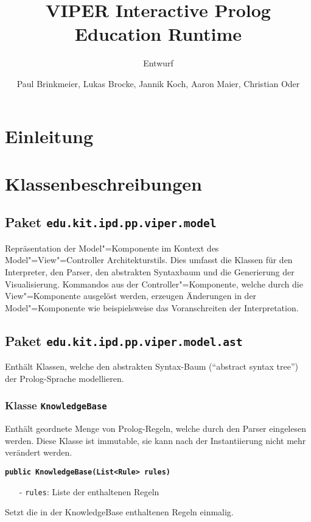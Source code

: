 \documentclass[parskip=full,11pt,twoside]{scrartcl}
\title{VIPER Interactive Prolog Education Runtime}
\subtitle{Entwurf}
\author{Paul Brinkmeier, Lukas Brocke, Jannik Koch, Aaron Maier, Christian Oder}
\begin{document}
\maketitle

\section{Einleitung}

\section{Klassenbeschreibungen}

\subsection{Paket \texttt{edu.kit.ipd.pp.viper.model}}

Repräsentation der Model"=Komponente im Kontext des Model"=View"=Controller Architekturstils. Dies umfasst die Klassen für den Interpreter, den Parser, den abstrakten Syntaxbaum und die Generierung der Visualisierung. Kommandos aus der Controller"=Komponente, welche durch die View"=Komponente ausgelöst werden, erzeugen Änderungen in der Model"=Komponente wie beispielsweise das Voranschreiten der Interpretation.

\subsection{Paket \texttt{edu.kit.ipd.pp.viper.model.ast}}

Enthält Klassen, welche den abstrakten Syntax-Baum (\enquote{abstract syntax tree}) der Prolog-Sprache modellieren.

\subsubsection{Klasse \texttt{KnowledgeBase}}
Enthält geordnete Menge von Prolog-Regeln, welche durch den Parser eingelesen werden. Diese Klasse ist immutable, sie kann nach der Instantiierung nicht mehr verändert werden.

\textbf{\texttt{public KnowledgeBase(List<Rule> rules)}}
\begin{itemize}[noitemsep]
	\item[-] \texttt{rules}: Liste der enthaltenen Regeln
\end{itemize}
Setzt die in der KnowledgeBase enthaltenen Regeln einmalig.
\end{document}
